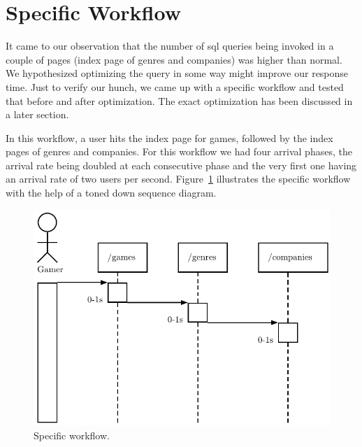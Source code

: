 \section{Specific Workflow}\label{sec:specific-workflow}
It came to our observation that the number of sql queries being invoked in a couple of pages (index page of genres and companies) was higher than normal. We hypothesized optimizing the query in some way might improve our response time. Just to verify our hunch, we came up with a specific workflow and tested that before and after optimization. The exact optimization has been discussed in a later section.

In this workflow, a user hits the index page for games, followed by the index pages of genres and companies. For this workflow we had four arrival phases, the arrival rate being doubled at each consecutive phase and the very first one having an arrival rate of two users per second. Figure~\ref{fig:specific} illustrates the specific workflow with the help of a toned down sequence diagram.

\begin{figure}
	\centering
	\includegraphics{images/specific}
	\caption{Specific workflow.}\label{fig:specific}
\end{figure}

